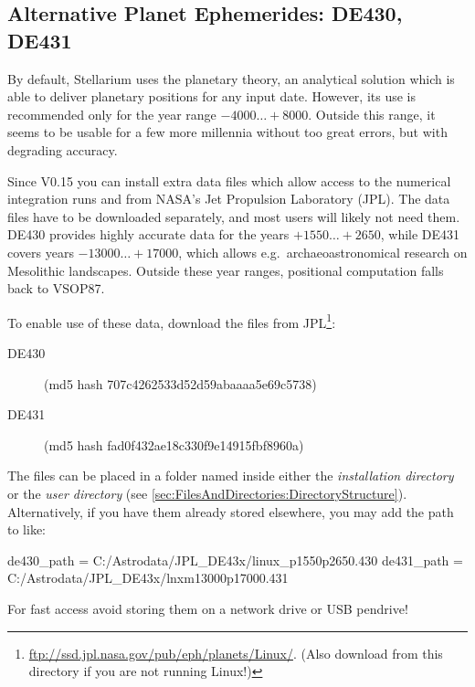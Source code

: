 \subsection{Alternative Planet Ephemerides: DE430, DE431}
\label{sec:ExtraData:ephemerides}

By default, Stellarium uses the  planetary theory,
an analytical solution which is able to deliver planetary positions
for any input date. However, its use is recommended only for the year
range $-4000\ldots+8000$. Outside this range, it seems to be usable
for a few more millennia without too great errors, but with degrading accuracy. 

Since V0.15 you can install extra data files which allow access to the
numerical integration runs  and 
from NASA's Jet Propulsion Laboratory (JPL). The data files have to be
downloaded separately, and most users will likely not need them. DE430
provides highly accurate data for the years $+1550\ldots+2650$, while
DE431 covers years $-13000\ldots+17000$, which allows e.g.\ 
archaeoastronomical research on Mesolithic landscapes. Outside these
year ranges, positional computation falls back to VSOP87.

To enable use of these data, download the files from
JPL\footnote{\url{ftp://ssd.jpl.nasa.gov/pub/eph/planets/Linux/}. (Also
  download from this directory if you are not running Linux!)}:

\begin{description}
\item[DE430]  (md5 hash 707c4262533d52d59abaaaa5e69c5738)
\item[DE431] \file{lnxm13000p17000.431} (md5 hash fad0f432ae18c330f9e14915fbf8960a)
\end{description}


The files can be placed in a folder named  inside either
the \emph{installation directory} or the \emph{user directory}
(see \ref{sec:FilesAndDirectories:DirectoryStructure}). Alternatively,
if you have them already stored elsewhere, you may add the path to
\file{config.ini} like:

\begin{configfile}
[astro]
de430_path = C:/Astrodata/JPL_DE43x/linux_p1550p2650.430
de431_path = C:/Astrodata/JPL_DE43x/lnxm13000p17000.431
\end{configfile}

For fast access avoid storing them on a network drive or USB pendrive!

